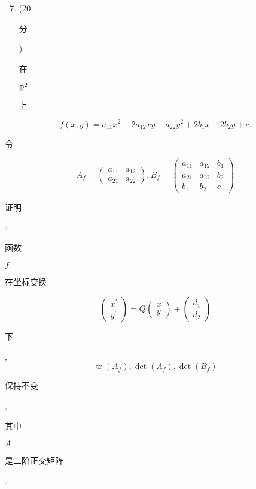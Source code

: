 \documentclass[10pt]{article}
\begin{document}
\begin{enumerate}
  \setcounter{enumi}{6}
  \item (20 \begin{CJK}{UTF8}{mj}分\end{CJK}) \begin{CJK}{UTF8}{mj}在\end{CJK} $\mathbb{R}^{2}$ \begin{CJK}{UTF8}{mj}上\end{CJK}
\end{enumerate}
$$
f(x, y)=a_{11} x^{2}+2 a_{12} x y+a_{22} y^{2}+2 b_{1} x+2 b_{2} y+c .
$$
\begin{CJK}{UTF8}{mj}令\end{CJK}
$$
A_{f}=\left(\begin{array}{cc}
a_{11} & a_{12} \\
a_{21} & a_{22}
\end{array}\right), B_{f}=\left(\begin{array}{ccc}
a_{11} & a_{12} & b_{1} \\
a_{21} & a_{22} & b_{2} \\
b_{1} & b_{2} & c
\end{array}\right)
$$
\begin{CJK}{UTF8}{mj}证明\end{CJK}: \begin{CJK}{UTF8}{mj}函数\end{CJK} $f$ \begin{CJK}{UTF8}{mj}在坐标变换\end{CJK}
$$
\left(\begin{array}{l}
x^{\prime} \\
y^{\prime}
\end{array}\right)=Q\left(\begin{array}{l}
x \\
y
\end{array}\right)+\left(\begin{array}{l}
d_{1} \\
d_{2}
\end{array}\right)
$$
\begin{CJK}{UTF8}{mj}下\end{CJK},
$$
\operatorname{tr}\left(A_{f}\right), \operatorname{det}\left(A_{f}\right), \operatorname{det}\left(B_{f}\right)
$$
\begin{CJK}{UTF8}{mj}保持不变\end{CJK}, \begin{CJK}{UTF8}{mj}其中\end{CJK} $A$ \begin{CJK}{UTF8}{mj}是二阶正交矩阵\end{CJK}.
\end{document}
